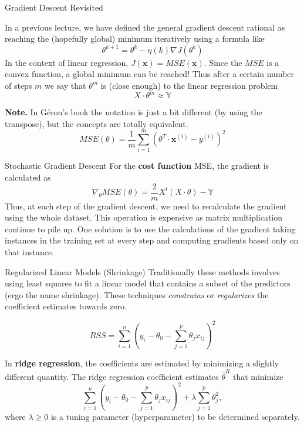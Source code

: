 \documentclass{beamer}
\begin{document}
\begin{frame}{Gradient Descent Revisited}
	
	In a previous lecture, we have defined the general gradient descent rational as reaching the (hopefully global) minimum iteratively using a formula like 
	\begin{equation*}
		\theta^{k+1}= \theta^k - \eta(k) \nabla J(\theta^k)
	\end{equation*}
	In the context of linear regression, $J(\mathbf{x})= MSE(\mathbf{x})$. Since the $MSE$ is a convex function, a global minimum can be reached! Thus after a certain number of steps $m$ we say that $\theta^m$ is (close enough) to the linear regression problem 
	\begin{equation*}
	 {X}  \cdot \theta ^m \approx \mathbb{Y}
	\end{equation*}

{\bf Note.} In G\'eron's book the notation is just a bit different (by using the transpose), but the concepts are totally equivalent.
\begin{equation*}
	MSE(\theta)=  \frac{1}{m} \sum_{i=1}^m (\theta^T \cdot \mathbf{x}^{(i)} - y^{(i)})^2
\end{equation*}
\end{frame}
\begin{frame}{Stochastic Gradient Descent}
	For the {\bf cost function} MSE, the gradient is calculated as
	\begin{equation*}
		\nabla_\theta MSE (\theta)= \frac{2}{m} X^t (X \cdot \theta)-\mathbb{Y}
	\end{equation*}
Thus, at each step of the gradient descent, we need to recalculate the gradient using the whole dataset. This operation is expensive as matrix multiplication continue to pile up. One solution is to use the calculations of the gradient taking instances in the training set at every step and computing  gradients based only on that instance. 


\end{frame}

\begin{frame}{Regularized Linear Models (Shrinkage)}
Traditionally these methods involves using least squares to fit a linear model that contains a subset of the predictors (ergo the name shrinkage).  These techniques {\it constrains} or {\it regularizes} the coefficient estimates towards zero.

\begin{equation*}
	RSS= \sum_{i=1}^n \left( y_i - \theta_0 - \sum_{j=1}^p \theta_j x_{ij} \right)^2
\end{equation*}

In {\bf ridge regression}, the coefficients are estimated by minimizing a slightly different quantity. The ridge regression coefficient estimates $\hat{\theta}^R$ that minimize
\begin{equation*}
\sum_{i=1}^n \left( y_i - \theta_0 - \sum_{j=1}^p \theta_j x_{ij} \right)^2 + \lambda \sum_{j=1}^p \theta_j^2,
\end{equation*} 
where $\lambda \ge 0$ is a tuning parameter (hyperparameter) to be determined separately. 




\end{frame}
\end{document}
